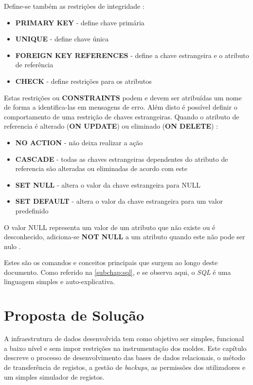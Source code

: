 \documentclass[11pt,twoside,a4paper]{report}
\begin{document}
Define-se também as restrições de integridade \cite{mysql}:
\begin{itemize}
	\item \textbf{PRIMARY KEY} - define chave primária
	\item \textbf{UNIQUE} - define chave única
	\item \textbf{FOREIGN KEY REFERENCES} - define a chave estrangeira e o atributo de referência
	\item \textbf{CHECK} - define restrições para os atributos
\end{itemize}
Estas restrições ou \textbf{CONSTRAINTS} podem e devem ser atribuídas um nome de forma a identifica-las em mensagens de erro. Além disto é possível definir o comportamento de uma restrição de chaves estrangeiras. Quando o atributo de referencia é alterado (\textbf{ON UPDATE}) ou eliminado (\textbf{ON DELETE}) \cite{mysql}:
\begin{itemize}
	\item \textbf{NO ACTION} - não deixa realizar a ação
	\item \textbf{CASCADE} - todas as chaves estrangeiras dependentes do atributo de referencia são alteradas ou eliminadas de acordo com este
	\item \textbf{SET NULL} - altera o valor da chave estrangeira para NULL
	\item \textbf{SET DEFAULT} - altera o valor da chave estrangeira para um valor predefinido
\end{itemize}
O valor NULL representa um valor de um atributo que não existe ou é desconhecido, adiciona-se \textbf{NOT NULL} a um atributo quando este não pode ser nulo \cite{mysql}.\par 
Estes são os comandos e conceitos principais que surgem ao longo deste documento. Como referido na \autoref{subchap:sql}, e se observa aqui, o \textit{SQL} é uma linguagem simples e auto-explicativa.

\cleardoublepage
\chapter{Proposta de Solução}
\label{chap:solucao}
A infraestrutura de dados desenvolvida tem como objetivo ser simples, funcional a baixo nível e sem impor restrições na instrumentação dos moldes. Este capítulo descreve o processo de desenvolvimento das bases de dados relacionais, o método de transferência de registos, a gestão de \textit{backups}, as permissões dos utilizadores e um simples simulador de registos.
\end{document}
